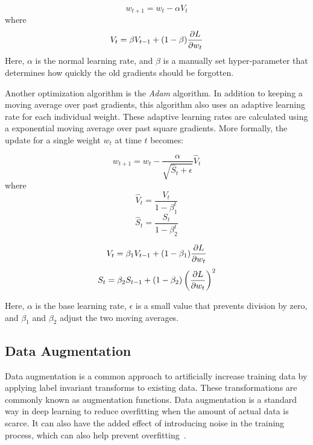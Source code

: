 \begin{equation}w_{t+1} = w_{t} - \alpha V_t\end{equation}
where 
\begin{equation}V_t = \beta V_{t-1} + (1-\beta)\frac{\partial L}{\partial w_t}\end{equation}
Here, $\alpha$ is the normal learning rate, and $\beta$ is a manually set hyper-parameter that determines how quickly the old gradients should be forgotten.

Another optimization algorithm is the \textit{Adam} algorithm. In addition to keeping a moving average over past gradients, this algorithm also uses an adaptive learning rate for each individual weight. These adaptive learning rates are calculated using a exponential moving average over past square gradients. More formally, the update for a single weight $w_t$ at time $t$ becomes:

\begin{equation}w_{t+1} = w_t - \frac{\alpha}{\sqrt{\hat{S}_t + \epsilon}} \hat{V}_t\end{equation}
where 
\begin{equation}\hat{V}_t = \frac{V_t}{1-\beta^t_1}\end{equation}
\begin{equation}\hat{S}_t = \frac{S_t}{1 - \beta^t_2}\end{equation}

\begin{equation}V_t = \beta_1 V_{t-1} + (1-\beta_1)\frac{\partial L}{\partial w_t}\end{equation}
\begin{equation}S_t = \beta_2 S_{t-1} + (1 - \beta_2)\left(\frac{\partial L}{\partial w_t}\right)^2\end{equation}

Here, $\alpha$ is the base learning rate, $\epsilon$ is a small value that prevents division by zero, and $\beta_1$ and $\beta_2$ adjust the two moving averages.


\subsection{Data Augmentation}\label{augmentation}
Data augmentation is a common approach to artificially increase training data by applying label invariant transforms to existing data. These transformations are commonly known as augmentation functions. Data augmentation is a standard way in deep learning to reduce overfitting when the amount of actual data is scarce. It can also have the added effect of introducing noise in the training process, which can also help prevent overfitting~\cite{deeplearningbook}.

